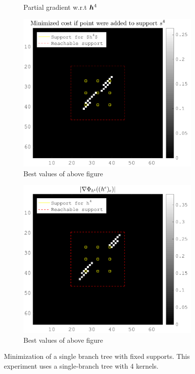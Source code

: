 \begin{figure}[!ht]
\begin{subfigure}[b]{0.49\textwidth}
\caption{Partial gradient w.r.t $\bm{h}^4$}
\end{subfigure}
\begin{subfigure}[b]{0.49\textwidth}\centering
\includegraphics[width=\textwidth]{figures/xp/n4/xp_128x128_sc2_angl1_K3_S3_node4_objmatrix_bestvalues.png}
\caption{Best values of above figure}
\end{subfigure}
\begin{subfigure}[b]{0.49\textwidth}\centering
\includegraphics[width=\textwidth]{figures/xp/n4/xp_128x128_sc2_angl1_K3_S3_node4_partgrad4_bestvalues.png}
\caption{Best values of above figure}
\end{subfigure}
\caption{Minimization of a single branch tree with fixed supports. This experiment uses a single-branch tree with 4 kernels.}\label{fig_gain_n4}
\end{figure}


